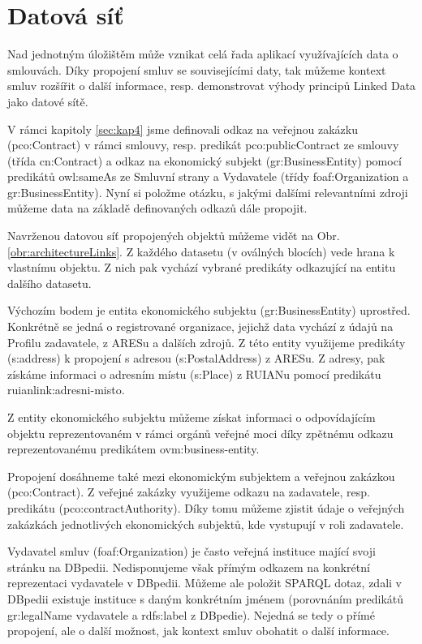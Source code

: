 \section{Datová síť}

Nad jednotným úložištěm může vznikat celá řada aplikací využívajících data o smlouvách. Díky propojení smluv se souvisejícími daty, tak můžeme kontext smluv rozšířit o další informace, resp. demonstrovat výhody principů Linked Data jako datové sítě.  

V rámci kapitoly \ref{sec:kap4} jsme definovali odkaz na veřejnou zakázku (pco:Contract) v rámci smlouvy, resp. predikát pco:publicContract ze smlouvy (třída cn:Contract) a odkaz na ekonomický subjekt (gr:BusinessEntity) pomocí predikátů owl:sameAs ze Smluvní strany a Vydavatele (třídy foaf:Organization a gr:BusinessEntity). Nyní si položme otázku, s jakými dalšími relevantními zdroji můžeme data na základě definovaných odkazů dále propojit.

Navrženou datovou síť propojených objektů můžeme vidět na Obr. \ref{obr:architectureLinks}. Z každého datasetu (v oválných blocích) vede hrana k vlastnímu objektu. Z nich pak vychází vybrané predikáty odkazující na entitu dalšího datasetu. 

Výchozím bodem je entita ekonomického subjektu (gr:BusinessEntity) uprostřed. Konkrétně se jedná o registrované organizace, jejichž data vychází z údajů na Profilu zadavatele, z ARESu a dalších zdrojů. Z této entity využijeme predikáty (s:address) k propojení s adresou (s:PostalAddress) z ARESu. Z adresy, pak získáme informaci o adresním místu (s:Place) z RUIANu pomocí predikátu ruianlink:adresni-misto.

Z entity ekonomického subjektu můžeme získat informaci o odpovídajícím objektu reprezentovaném v rámci orgánů veřejné moci díky zpětnému odkazu reprezentovanému predikátem ovm:business-entity. 

Propojení dosáhneme také mezi ekonomickým subjektem a veřejnou zakázkou (pco:Contract). Z veřejné zakázky využijeme odkazu na zadavatele, resp. predikátu (pco:contractAuthority). Díky tomu můžeme zjistit údaje o veřejných zakázkách jednotlivých ekonomických subjektů, kde vystupují v roli zadavatele.

Vydavatel smluv (foaf:Organization) je často veřejná instituce mající svoji stránku na DBpedii. Nedisponujeme však přímým odkazem na konkrétní reprezentaci vydavatele v DBpedii. Můžeme ale položit SPARQL dotaz, zdali v DBpedii existuje instituce s daným konkrétním jménem (porovnáním predikátů gr:legalName vydavatele a rdfs:label z DBpedie). Nejedná se tedy o přímé propojení, ale o další možnost, jak kontext smluv obohatit o další informace.

